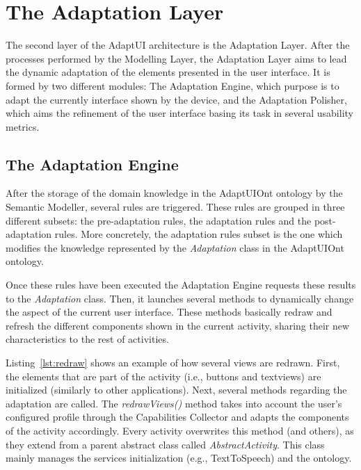 \section{The Adaptation Layer}
\label{sec:adaptation_layer}

The second layer of the AdaptUI architecture is the Adaptation Layer. After the
processes performed by the Modelling Layer, the Adaptation Layer aims to lead the
dynamic adaptation of the elements presented in the user interface. It is formed
by two different modules: The Adaptation Engine, which purpose is to adapt the
currently interface shown by the device, and the Adaptation Polisher, which aims
the refinement of the user interface basing its task in several usability metrics.


\subsection{The Adaptation Engine}
\label{sec:adaptation_engine}

After the storage of the domain knowledge in the AdaptUIOnt ontology by the
Semantic Modeller, several rules are triggered. These rules are grouped in three
different subsets: the pre-adaptation rules, the adaptation rules and the post-adaptation
rules. More concretely, the adaptation rules subset is the one which modifies
the knowledge represented by the \textit{Adaptation} class in the AdaptUIOnt
ontology.

Once these rules have been executed the Adaptation Engine requests these results
to the \textit{Adaptation} class. Then, it launches several methods to dynamically
change the aspect of the current user interface. These methods basically redraw
and refresh the different components shown in the current activity, sharing
their new characteristics to the rest of activities. 

Listing~\ref{lst:redraw} shows an example of how several views are redrawn.
First, the elements that are part of the activity (i.e., buttons and textviews)
are initialized (similarly to other applications). Next, several methods regarding
the adaptation are called. The \textit{redrawViews()} method takes into account
the user's configured profile through the Capabilities Collector and adapts the
components of the activity accordingly. Every activity overwrites this method
(and others), as they extend from a parent abstract class called
\textit{AbstractActivity}. This class mainly manages the services initialization
(e.g., TextToSpeech) and the ontology. 


